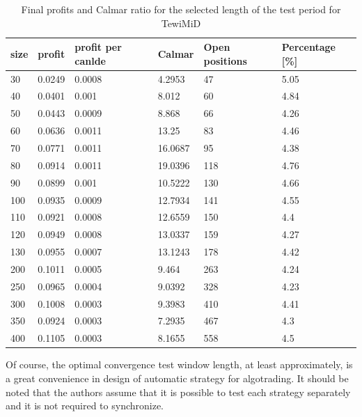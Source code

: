 \documentclass{tewiart}
\begin{document}
\begin{table}[h!]
\caption{Final profits and Calmar ratio for the selected length of the test period for TewiMiD}
\tiny
\label{table2}
\begin{center}
 \begin{tabular}{|l|l|l|l|l|l|} 
 \hline size & profit & profit per canlde & Calmar & Open positions & Percentage [\%]\\ \hline  
 30 & 0.0249 & 0.0008 & 4.2953 & 47 & 5.05 \\ 
 40 & 0.0401 & 0.001 & 8.012 & 60 & 4.84 \\ 
 50 & 0.0443 & 0.0009 & 8.868 & 66 & 4.26 \\ 
 60 & 0.0636 & 0.0011 & 13.25 & 83 & 4.46 \\ 
 70 & 0.0771 & 0.0011 & 16.0687 & 95 & 4.38 \\ 
 80 & 0.0914 & 0.0011 & 19.0396 & 118 & 4.76 \\ 
 90 & 0.0899 & 0.001 & 10.5222 & 130 & 4.66 \\ 
 100 & 0.0935 & 0.0009 & 12.7934 & 141 & 4.55 \\ 
 110 & 0.0921 & 0.0008 & 12.6559 & 150 & 4.4 \\ 
 120 & 0.0949 & 0.0008 & 13.0337 & 159 & 4.27 \\ 
 130 & 0.0955 & 0.0007 & 13.1243 & 178 & 4.42 \\ 
 200 & 0.1011 & 0.0005 & 9.464 & 263 & 4.24 \\ 
 250 & 0.0965 & 0.0004 & 9.0392 & 328 & 4.23 \\ 
 300 & 0.1008 & 0.0003 & 9.3983 & 410 & 4.41 \\ 
 350 & 0.0924 & 0.0003 & 7.2935 & 467 & 4.3 \\ 
 400 & 0.1105 & 0.0003 & 8.1655 & 558 & 4.5 \\ 
 \hline \end{tabular} 
\end{center}
 \end{table}

Of course, the optimal convergence test window length, at least approximately, is a great convenience in design of automatic strategy for algotrading. It should be noted that the authors assume that it is possible to test each strategy separately and it is not required to synchronize.\\
\end{document}
